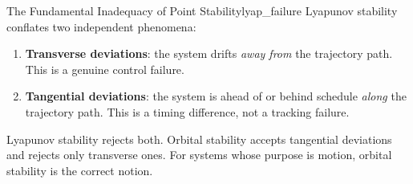 \documentclass[12pt, openany]{book}
\theoremstyle{plain}
\begin{document}
\begin{keyidea}{The Fundamental Inadequacy of Point Stability}{lyap_failure}
  Lyapunov stability conflates two independent phenomena:
  \begin{enumerate}[label=(\roman*)]
    \item \textbf{Transverse deviations}: the system drifts \emph{away from}
      the trajectory path. This is a genuine control failure.
    \item \textbf{Tangential deviations}: the system is ahead of or behind
      schedule \emph{along} the trajectory path. This is a timing difference,
      not a tracking failure.
  \end{enumerate}
  Lyapunov stability rejects both. Orbital stability accepts tangential
  deviations and rejects only transverse ones. For systems whose purpose is
  motion, orbital stability is the correct notion.
\end{keyidea}
\end{document}
